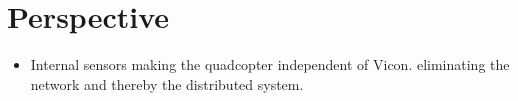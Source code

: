\chapter{Perspective}
\begin{itemize}
\item Internal sensors making the quadcopter independent of Vicon.
eliminating the network and thereby the distributed system. 

\end{itemize}